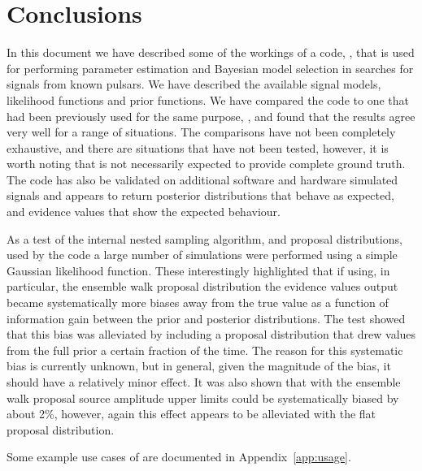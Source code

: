 \section{Conclusions}

In this document we have described some of the workings of a code, \lppenf, that is used for performing parameter estimation and Bayesian model
selection in searches for \gw signals from known pulsars. We have described the available signal models, likelihood functions and prior functions.
We have compared the code to one that had been previously used for the same purpose, \lppef, and found that the results agree very well for a range
of situations. The comparisons have not been completely exhaustive, and there are situations that have not been tested, however, it is worth noting
that \lppe is not necessarily expected to provide complete ground truth. The code has also be validated on additional software and hardware simulated
signals and appears to return posterior distributions that behave as expected, and evidence values that show the expected behaviour.

As a test of the internal nested sampling algorithm, and proposal distributions, used by the code a large number of simulations were performed using
a simple Gaussian likelihood function. These interestingly highlighted that if using, in particular, the ensemble walk proposal distribution the evidence
values output became systematically more biases away from the true value as a function of information gain between the prior and posterior distributions.
The test showed that this bias was alleviated by including a proposal distribution that drew values from the full prior a certain fraction of the time.
The reason for this systematic bias is currently unknown, but in general, given the magnitude of the bias, it should have a relatively minor effect. It was
also shown that with the ensemble walk proposal source amplitude upper limits could be systematically biased by about 2\%, however, again this effect
appears to be alleviated with the flat proposal distribution.

Some example use cases of \lppen are documented in Appendix~\ref{app:usage}.
